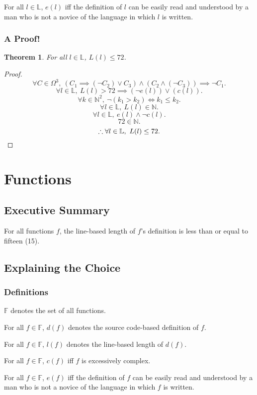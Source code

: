 \documentclass{report}
\newtheorem{thm}{Theorem}
\begin{document}
For all $l \in \mathbb L$, $e(l)$ iff the definition of $l$ can be easily read and understood by a man who is not a novice of the language in which $l$ is written.
\subsubsection{A Proof!}
\begin{thm}
	For all $l \in \mathbb L$, $L(l) \leq 72$.
\end{thm}
\begin{proof}
	\[
		\forall C \in \Omega^3,\ 
		\left(C_1 \implies (\neg C_2) \lor C_3\right)
		\land
		\left(C_2 \land (\neg C_3)\right)
		\implies \neg C_1.
	\]
	\[
		\forall l \in \mathbb L,\ 
		L(l) > 72 \implies \left(\neg e(l)\right) \lor \left(c(l)\right).
	\]
	\[
		\forall k \in \mathbb N^2,\ 
		\neg \left(k_1 > k_2\right) \iff k_1 \leq k_2.
	\]
	\[
		\forall l \in \mathbb L,\ 
		L(l) \in \mathbb N.
	\]
	\[
		\forall l \in \mathbb L,\ 
		e(l) \land \neg c(l).
	\]
	\[
		72 \in \mathbb N.
	\]
	\[
		\therefore
		\forall l \in \mathbb L,\ 
		L(l) \leq 72.
		\qedhere
	\]
\end{proof}
\section{Functions}
\subsection{Executive Summary}
For all functions $f$, the line-based length of $f$'s definition is less than or equal to fifteen (15).
\subsection{Explaining the Choice}
\subsubsection{Definitions}
$\mathbb F$ denotes the set of all functions.

For all $f \in \mathbb F$, $d(f)$ denotes the source code-based definition of $f$.

For all $f \in \mathbb F$, $l(f)$ denotes the line-based length of $d(f)$.

For all $f \in \mathbb F$, $c(f)$ iff $f$ is excessively complex.

For all $f \in \mathbb F$, $e(f)$ iff the definition of $f$ can be easily read and understood by a man who is not a novice of the language in which $f$ is written.
\end{document}
